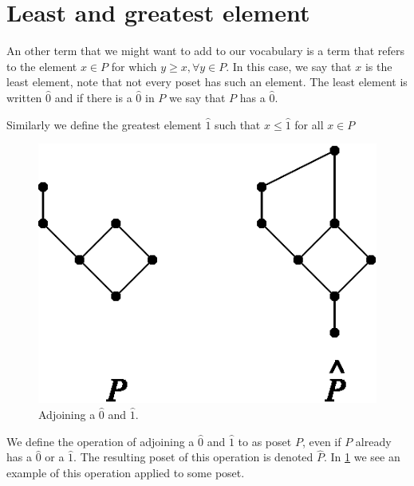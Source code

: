 \section{Least and greatest element}
\label{tree:poset:leastandgreatest}

An other term that we might want to add to our vocabulary is a term that refers to the element $x \in P$ for which $y \geq x, \forall y \in P$. In this case, we say that $x$ is the least element, note that not every poset has such an element. The least element is written $\hat{0}$ and if there is a $\hat{0}$ in $P$ we say that $P$ has a $\hat{0}$.

Similarly we define the greatest element $\hat{1}$ such that $x \leq \hat{1}$ for all $x \in P$

\begin{figure}
	\centering
	\includegraphics[height=0.2\textheight]{fig/stanley/3-3}
	\caption{\label{fig:stanley:3-3} Adjoining a $\hat{0}$ and $\hat{1}$. \cite{Stanley:2011:ECV:2124415}}
\end{figure}

We define the operation of adjoining a $\hat{0}$ and $\hat{1}$ to as poset $P$, even if $P$ already has a $\hat{0}$ or a $\hat{1}$. The resulting poset of this operation is denoted $\hat{P}$. In \ref{fig:stanley:3-3} we see an example of this operation applied to some poset.



